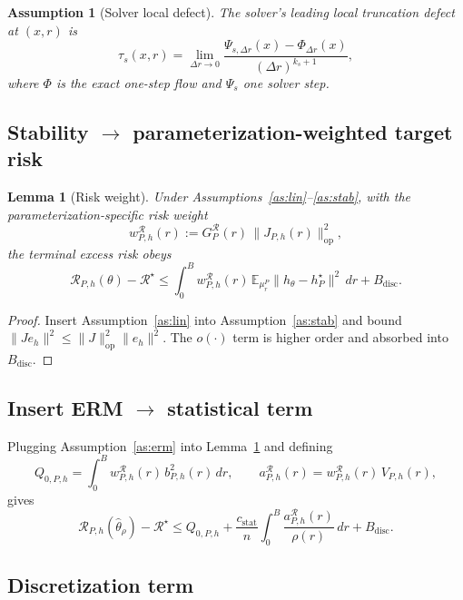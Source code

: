\documentclass[11pt]{article}
\newtheorem{lemma}{Lemma}
\newtheorem{assumption}{Assumption}
\newcommand{\R}{\mathcal R}
\newcommand{\E}{\mathbb E}
\newcommand{\norm}[1]{\lVert #1 \rVert}
\begin{document}
\begin{assumption}[Solver local defect]\label{as:solver}
The solver's leading local truncation defect at $(x,r)$ is
\[
\tau_s(x,r)=\lim_{\Delta r\to 0}\frac{\Psi_{s,\Delta r}(x)-\Phi_{\Delta r}(x)}{(\Delta r)^{k_s+1}},
\]
where $\Phi$ is the exact one-step flow and $\Psi_s$ one solver step.
\end{assumption}

\subsection{Stability $\to$ parameterization-weighted target risk}

\begin{lemma}[Risk weight]\label{lem:weight}
Under Assumptions~\ref{as:lin}--\ref{as:stab}, with the
\emph{parameterization-specific risk weight}
\[
w_{P,h}^\R(r):=G_P^\R(r)\,\norm{J_{P,h}(r)}_{\mathrm{op}}^2 ,
\]
the terminal excess risk obeys
\[
\R_{P,h}(\theta)-\R^\star \le
\int_0^B w_{P,h}^\R(r)\,\E_{\mu_r^P}\norm{h_\theta-h_P^\star}^2\,dr + B_{\mathrm{disc}} .
\]
\end{lemma}
\begin{proof}
Insert Assumption~\ref{as:lin} into Assumption~\ref{as:stab} and bound
$\norm{J e_h}^2\le\norm{J}_{\mathrm{op}}^2\norm{e_h}^2$. The $o(\cdot)$
term is higher order and absorbed into $B_{\mathrm{disc}}$.
\end{proof}

\subsection{Insert ERM $\to$ statistical term}

Plugging Assumption~\ref{as:erm} into Lemma~\ref{lem:weight} and defining
\[
Q_{0,P,h}=\int_0^B w_{P,h}^\R(r)\,b_{P,h}^2(r)\,dr,
\qquad
a_{P,h}^\R(r)=w_{P,h}^\R(r)\,V_{P,h}(r),
\]
gives
\[
\R_{P,h}(\hat\theta_\rho)-\R^\star \le
Q_{0,P,h}+\frac{c_{\mathrm{stat}}}{n}\int_0^B\frac{a_{P,h}^\R(r)}{\rho(r)}\,dr
+ B_{\mathrm{disc}} .
\]

\subsection{Discretization term}
\end{document}
